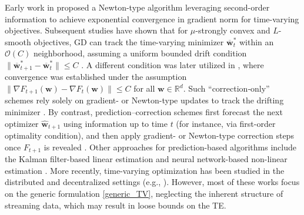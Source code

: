 \documentclass[conference]{IEEEtran}
\newcommand{\fraz}[1]{\textcolor{purple}{\bf [Fraz: #1]}}
\begin{document}
Early work in \cite{tracking_minimum_1998}
proposed a Newton-type
algorithm leveraging second-order information to achieve exponential convergence in gradient norm for time-varying objectives. Subsequent studies have shown that for $\mu$-strongly convex and $L$-smooth objectives, GD can track the time-varying minimizer $\overline{\mathbf{w}}_t^*$ within an $\mathcal{O}(C)$ neighborhood, assuming a uniform bounded drift condition $\|\overline{\mathbf{w}}^*_{t+1} -
\overline{\mathbf{w}}^*_t\| \leq C$ \cite{Polyak_book,Time_Structured}. A different condition was later utilized in \cite{Popkov}, where convergence was established under the assumption $\|\nabla F_{t+1}(\mathbf{w})
- \nabla F_{t}(\mathbf{w})\| \leq C$ for all $\mathbf{w} \in \mathbb{R}^d$. Such “correction‐only” schemes rely solely on gradient- or Newton-type updates to track the drifting minimizer \cite{Time_Structured}.  By contrast,
prediction–correction schemes first forecast the next optimizer $\widehat{\mathbf{w}}_{t+1}$ using information up to time $t$ (for instance, via first-order optimality condition), and then apply gradient- or Newton-type correction steps once $F_{t+1}$ is revealed \cite{Class_Prediction_Correction}. Other approaches for prediction-based algorithms include the Kalman filter-based linear estimation and neural network-based non-linear estimation
\cite{Parameter_based_prediction}. More recently, time-varying
optimization has been studied in the distributed and decentralized
settings (e.g.,
\cite{Simonetto2016DecentralizedPM,Distributed_TV_Quadratic,D_cont_TV,hu2024energy}). However, most of these works focus on the generic formulation \eqref{generic_TV},
neglecting the inherent structure of streaming data, which may result in loose bounds on the TE.
\end{document}
